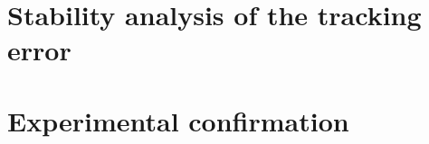 \documentclass[journal,twocolumn]{IEEEtran}
\begin{document}






\section{Stability analysis of the tracking error}



\section{Experimental confirmation}
\end{document}
